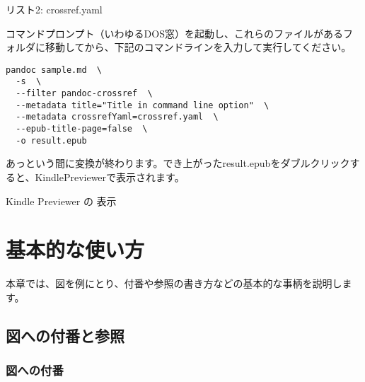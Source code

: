 リスト2: crossref.yaml

\begin{Shaded}
\begin{Highlighting}[]
\KeywordTok{:}\AttributeTok{ }

\KeywordTok{:}\AttributeTok{ }\AttributeTok{  }
\KeywordTok{:}\AttributeTok{ }
\KeywordTok{:}\AttributeTok{ }
\end{Highlighting}
\end{Shaded}

コマンドプロンプト（いわゆるDOS窓）を起動し、これらのファイルがあるフォルダに移動してから、下記のコマンドラインを入力して実行してください。

\begin{verbatim}
pandoc sample.md  \
  -s  \
  --filter pandoc-crossref  \
  --metadata title="Title in command line option"  \
  --metadata crossrefYaml=crossref.yaml  \
  --epub-title-page=false  \
  -o result.epub
\end{verbatim}

あっという間に変換が終わります。でき上がったresult.epubをダブルクリックすると、KindlePreviewerで表示されます。

Kindle Previewer の 表示

\chapter{基本的な使い方}\label{ux57faux672cux7684ux306aux4f7fux3044ux65b9}

本章では、図を例にとり、付番や参照の書き方などの基本的な事柄を説明します。

\section{図への付番と参照}\label{ux56f3ux3078ux306eux4ed8ux756aux3068ux53c2ux7167}

\subsection{図への付番}\label{ux56f3ux3078ux306eux4ed8ux756a}

